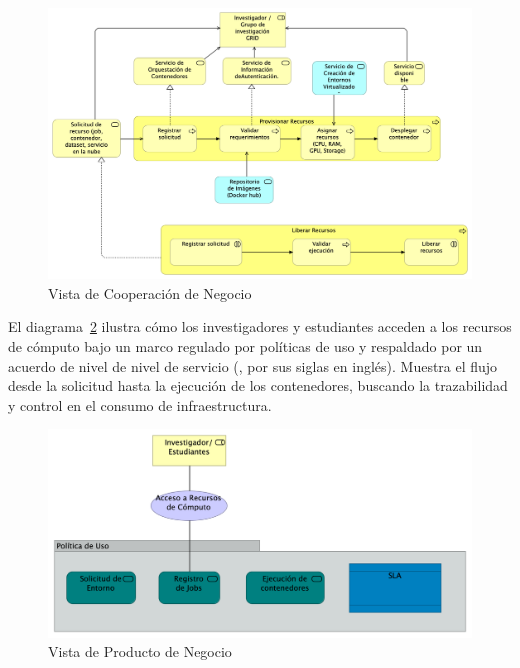 \begin{figure}[H]
    \centering
    \includegraphics[width=\textwidth]{tablas-images/cp6/Business-Cooperation-View.png}
    \caption{Vista de Cooperación de Negocio}\label{fig:vista-cooperacion-negocio}
\end{figure}
\noindent
El diagrama~\ref{fig:vista-productos-negocio} ilustra cómo los investigadores y estudiantes acceden a los recursos de cómputo bajo un marco regulado por políticas de uso y respaldado por un acuerdo de nivel de nivel de servicio (\SLA, por sus siglas en inglés). Muestra el flujo desde la solicitud hasta la ejecución de los contenedores, buscando la trazabilidad y control en el consumo de infraestructura.

\begin{figure}[H]
    \centering
    \includegraphics[width=\textwidth]{tablas-images/cp6/Business-Product-View.png}
    \caption{Vista de Producto de Negocio}\label{fig:vista-productos-negocio}
\end{figure}

